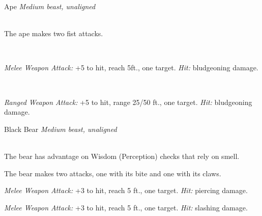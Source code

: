 \documentclass[10pt,twoside,twocolumn,openany]{book}
\begin{document}
\begin{monsterboxnobg}{Ape}
	\textit{Medium beast, unaligned}\\
	\hline
	\basics[
		armorclass	= 12,
		hitpoints 		= \dice{3d8 + 6},
		speed		= {30 ft., climb 30 ft.}
	]
	\hline
	\stats[
		STR	= \stat{16},
		DEX	= \stat{14},
		CON	= \stat{14},
		INT	= \stat{6},
		WIS	= \stat{12},
		CHA	= \stat{7}
	]
	\hline
	\details[
		skills			= {Athletics +5, Perception +3},
		senses		= {passive Perception 13},
		languages		= {-},
		challenge		= 1/2
	]
	\hline \\[1mm]
	\begin{monsteraction}[Multiattack]
		The ape makes two fist attacks.
	\end{monsteraction}\\
	\begin{monsteraction}[Multiattack]
		\textit{Melee Weapon Attack:} +5 to hit, reach 5ft., one target. \textit{Hit:}  bludgeoning damage.
	\end{monsteraction}\\
	\begin{monsteraction}[Rock]
		\textit{Ranged Weapon Attack:} +5 to hit, range 25/50 ft., one target. \textit{Hit:}  bludgeoning damage.
	\end{monsteraction}
\end{monsterboxnobg}

\begin{monsterboxnobg}{Black Bear}
	\textit{Medium beast, unaligned}\\
	\hline
	\basics[
		armorclass	= 11 (natural armor),
		hitpoints 		= \dice{3d8 + 6},
		speed		= {40 ft., climb 30 ft.}
	]
	\hline
	\stats[
		STR	= \stat{15}, 
		DEX	= \stat{10},
		CON	= \stat{14},
		INT	= \stat{2},
		WIS	= \stat{12},
		CHA	= \stat{7}
	]
	\hline
	\details[
	skills			= {Perception +3},
	senses		= {passive Perception 11},
	languages		= {-},
	challenge		= 1/2
	]
	\hline \\[1mm]
	\begin{monsteraction}
		The bear has advantage on Wisdom (Perception) checks that rely on smell.
	\end{monsteraction}
	\begin{monsteraction}[Multiattack]
		The bear makes two attacks, one with its bite and one with its claws.
	\end{monsteraction}
	
	\begin{monsteraction}[Bite]
		\textit{Melee Weapon Attack:} +3 to hit, reach 5 ft., one target. \textit{Hit:}  piercing damage.
	\end{monsteraction}
	
	\begin{monsteraction}[Claws]
		\textit{Melee Weapon Attack:} +3 to hit, reach 5 ft., one target. \textit{Hit:}  slashing damage.
	\end{monsteraction}	
\end{monsterboxnobg}
\end{document}
